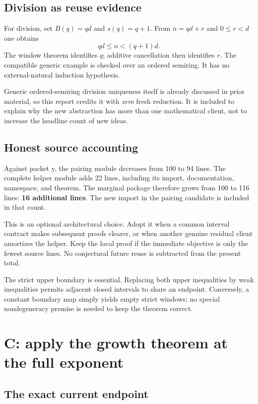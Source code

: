 \documentclass[11pt,letterpaper]{article}
\begin{document}
\subsection{Division as reuse evidence}

For division, set $B(q)=qd$ and $s(q)=q+1$. From $n=qd+r$ and $0\le r<d$ one obtains
\[
 qd\le n<(q+1)d.
\]
The window theorem identifies $q$; additive cancellation then identifies $r$. The compatible generic example is checked over an ordered semiring. It has no external-natural induction hypothesis.

Generic ordered-semiring division uniqueness itself is already discussed in prior material, so this report credits it with \emph{zero} fresh reduction. It is included to explain why the new abstraction has more than one mathematical client, not to increase the headline count of new ideas.

\subsection{Honest source accounting}

Against packet y, the pairing module decreases from 100 to 94 lines. The complete helper module adds 22 lines, including its import, documentation, namespace, and theorem. The marginal package therefore grows from 100 to 116 lines: \textbf{16 additional lines}. The new import in the pairing candidate is included in that count.

This is an optional architectural choice. Adopt it when a common interval contract makes subsequent proofs clearer, or when another genuine residual client amortizes the helper. Keep the local proof if the immediate objective is only the fewest source lines. No conjectural future reuse is subtracted from the present total.

The strict upper boundary is essential. Replacing both upper inequalities by weak inequalities permits adjacent closed intervals to share an endpoint. Conversely, a constant boundary map simply yields empty strict windows; no special nondegeneracy premise is needed to keep the theorem correct.

\section{C: apply the growth theorem at the full exponent}

\subsection{The exact current endpoint}
\end{document}
